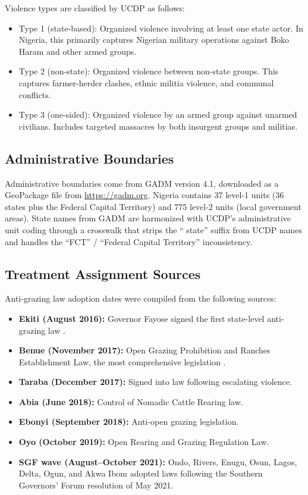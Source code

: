 \documentclass[12pt]{article}
\begin{document}
Violence types are classified by UCDP as follows:
\begin{itemize}
\item Type 1 (state-based): Organized violence involving at least one state actor. In Nigeria, this primarily captures Nigerian military operations against Boko Haram and other armed groups.
\item Type 2 (non-state): Organized violence between non-state groups. This captures farmer-herder clashes, ethnic militia violence, and communal conflicts.
\item Type 3 (one-sided): Organized violence by an armed group against unarmed civilians. Includes targeted massacres by both insurgent groups and militias.
\end{itemize}

\subsection{Administrative Boundaries}

Administrative boundaries come from GADM version 4.1, downloaded as a GeoPackage file from \url{https://gadm.org}. Nigeria contains 37 level-1 units (36 states plus the Federal Capital Territory) and 775 level-2 units (local government areas). State names from GADM are harmonized with UCDP's administrative unit coding through a crosswalk that strips the `` state'' suffix from UCDP names and handles the ``FCT'' / ``Federal Capital Territory'' inconsistency.

\subsection{Treatment Assignment Sources}

Anti-grazing law adoption dates were compiled from the following sources:
\begin{itemize}
\item \textbf{Ekiti (August 2016):} Governor Fayose signed the first state-level anti-grazing law \citep{ajala2020anti}.
\item \textbf{Benue (November 2017):} Open Grazing Prohibition and Ranches Establishment Law, the most comprehensive legislation \citep{ochonu2022anti}.
\item \textbf{Taraba (December 2017):} Signed into law following escalating violence.
\item \textbf{Abia (June 2018):} Control of Nomadic Cattle Rearing law.
\item \textbf{Ebonyi (September 2018):} Anti-open grazing legislation.
\item \textbf{Oyo (October 2019):} Open Rearing and Grazing Regulation Law.
\item \textbf{SGF wave (August--October 2021):} Ondo, Rivers, Enugu, Osun, Lagos, Delta, Ogun, and Akwa Ibom adopted laws following the Southern Governors' Forum resolution of May 2021.
\end{itemize}
\end{document}
